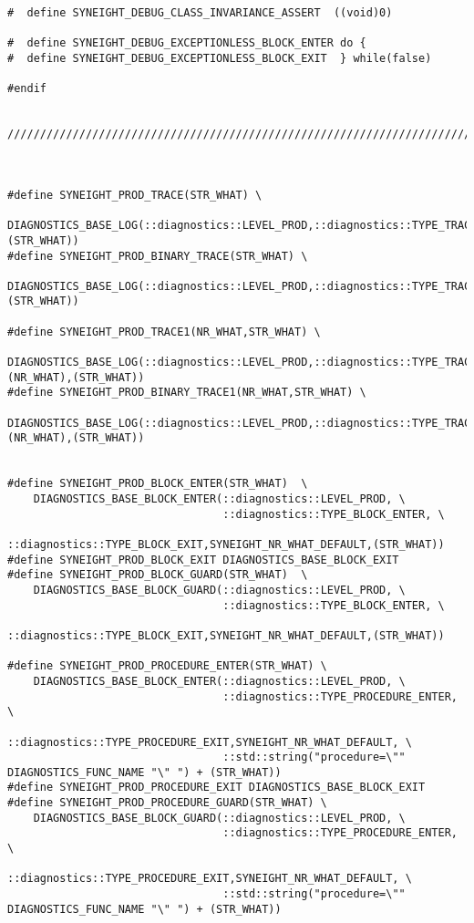 \begin{verbatim}
#  define SYNEIGHT_DEBUG_CLASS_INVARIANCE_ASSERT  ((void)0)

#  define SYNEIGHT_DEBUG_EXCEPTIONLESS_BLOCK_ENTER do {
#  define SYNEIGHT_DEBUG_EXCEPTIONLESS_BLOCK_EXIT  } while(false)

#endif


////////////////////////////////////////////////////////////////////////////////



#define SYNEIGHT_PROD_TRACE(STR_WHAT) \
    DIAGNOSTICS_BASE_LOG(::diagnostics::LEVEL_PROD,::diagnostics::TYPE_TRACE,SYNEIGHT_NR_WHAT_DEFAULT,(STR_WHAT))
#define SYNEIGHT_PROD_BINARY_TRACE(STR_WHAT) \
    DIAGNOSTICS_BASE_LOG(::diagnostics::LEVEL_PROD,::diagnostics::TYPE_TRACE_BINARY,SYNEIGHT_NR_WHAT_DEFAULT,(STR_WHAT))

#define SYNEIGHT_PROD_TRACE1(NR_WHAT,STR_WHAT) \
    DIAGNOSTICS_BASE_LOG(::diagnostics::LEVEL_PROD,::diagnostics::TYPE_TRACE,(NR_WHAT),(STR_WHAT))
#define SYNEIGHT_PROD_BINARY_TRACE1(NR_WHAT,STR_WHAT) \
    DIAGNOSTICS_BASE_LOG(::diagnostics::LEVEL_PROD,::diagnostics::TYPE_TRACE_BINARY,(NR_WHAT),(STR_WHAT))


#define SYNEIGHT_PROD_BLOCK_ENTER(STR_WHAT)  \
    DIAGNOSTICS_BASE_BLOCK_ENTER(::diagnostics::LEVEL_PROD, \
                                 ::diagnostics::TYPE_BLOCK_ENTER, \
                                 ::diagnostics::TYPE_BLOCK_EXIT,SYNEIGHT_NR_WHAT_DEFAULT,(STR_WHAT))
#define SYNEIGHT_PROD_BLOCK_EXIT DIAGNOSTICS_BASE_BLOCK_EXIT
#define SYNEIGHT_PROD_BLOCK_GUARD(STR_WHAT)  \
    DIAGNOSTICS_BASE_BLOCK_GUARD(::diagnostics::LEVEL_PROD, \
                                 ::diagnostics::TYPE_BLOCK_ENTER, \
                                 ::diagnostics::TYPE_BLOCK_EXIT,SYNEIGHT_NR_WHAT_DEFAULT,(STR_WHAT))

#define SYNEIGHT_PROD_PROCEDURE_ENTER(STR_WHAT) \
    DIAGNOSTICS_BASE_BLOCK_ENTER(::diagnostics::LEVEL_PROD, \
                                 ::diagnostics::TYPE_PROCEDURE_ENTER, \
                                 ::diagnostics::TYPE_PROCEDURE_EXIT,SYNEIGHT_NR_WHAT_DEFAULT, \
                                 ::std::string("procedure=\"" DIAGNOSTICS_FUNC_NAME "\" ") + (STR_WHAT))
#define SYNEIGHT_PROD_PROCEDURE_EXIT DIAGNOSTICS_BASE_BLOCK_EXIT
#define SYNEIGHT_PROD_PROCEDURE_GUARD(STR_WHAT) \
    DIAGNOSTICS_BASE_BLOCK_GUARD(::diagnostics::LEVEL_PROD, \
                                 ::diagnostics::TYPE_PROCEDURE_ENTER, \
                                 ::diagnostics::TYPE_PROCEDURE_EXIT,SYNEIGHT_NR_WHAT_DEFAULT, \
                                 ::std::string("procedure=\"" DIAGNOSTICS_FUNC_NAME "\" ") + (STR_WHAT))


\end{verbatim}
